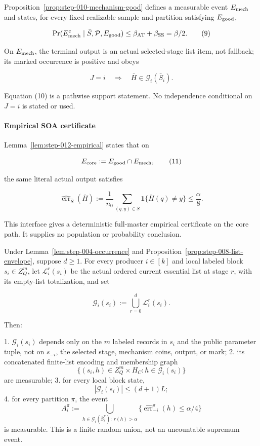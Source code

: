 Proposition~\ref{prop:step-010-mechanism-good} defines a measurable
event \(E_{\rm mech}\) and states, for every fixed realizable sample and
partition satisfying \(E_{\rm good}\),

\[
 \Pr(E_{\rm mech}^c\mid\bar S,\mathcal P,E_{\rm good})
 \leq\beta_{\rm AT}+\beta_{\rm SS}=\beta/2.
 \tag{9}
\]

On \(E_{\rm mech}\), the terminal output is an actual selected-stage list
item, not fallback; its  marked occurrence is positive and obeys

\[
 J=i\quad\Longrightarrow\quad
 \bar H\in\mathcal G_i(\bar S_i).
 \tag{10}
\]

Equation (10) is a pathwise support statement. No independence conditional
on \(J=i\) is stated or used.

\paragraph{Empirical SOA certificate}

Lemma~\ref{lem:step-012-empirical} states that on

\[
 E_{\rm core}:=E_{\rm good}\cap E_{\rm mech},
 \tag{11}
\]

the same literal actual output satisfies

\[
 \widehat{\operatorname{err}}_{\bar S}(\bar H)
 :=\frac1{n_0}\sum_{(q,y)\in\bar S}
       \mathbf1\{\bar H(q)\ne y\}
 \leq\frac{\alpha}{8}.
 \tag{12}
\]

This interface gives a deterministic full-master empirical certificate on
the core path. It supplies no population or probability conclusion.

\begin{lemma}\label{lem:step-013-block-family}
Under Lemma~\ref{lem:step-004-occurrence} and Proposition~\ref{prop:step-008-list-envelope}, suppose \(d\geq1\). For every
producer \(i\in[k]\) and local labeled block \(s_i\in Z_Q^m\), let
\(\mathcal L_i^r(s_i)\) be the actual ordered current essential list at stage
\(r\), with its empty-list totalization, and set

\[
 \mathcal G_i(s_i)
 :=\bigcup_{r=0}^d\mathcal L_i^r(s_i).
 \tag{16}
\]

Then:

1. \(\mathcal G_i(s_i)\) depends only on the \(m\) labeled records in
   \(s_i\) and the public parameter tuple, not on \(s_{-i}\), the selected
   stage, mechanism coins, output, or mark;
2. its concatenated finite-list encoding and membership graph
   \[
     \{(s_i,h)\in Z_Q^m\times H_C:h\in\mathcal G_i(s_i)\}
     \tag{17}
   \]
   are measurable;
3. for every local block state,
   \[
     |\mathcal G_i(s_i)|\leq(d+1)L;
     \tag{18}
   \]
4. for every partition \(\pi\), the event
   \[
    A_i^\pi:=
    \bigcup_{h\in\mathcal G_i(\bar S_i^\pi):\ r(h)>\alpha}
      \{\widehat{\operatorname{err}}_{-i}^\pi(h)\leq\alpha/4\}
    \tag{19}
   \]
   is measurable. This is a finite random union, not an uncountable
   supremum event.


\end{lemma}

